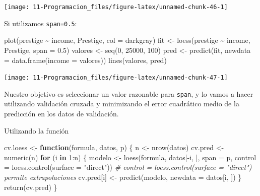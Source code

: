 \documentclass[
]{book}
\newenvironment{Shaded}{\begin{snugshade}}{\end{snugshade}}
\newcommand{\AttributeTok}[1]{\textcolor[rgb]{0.77,0.63,0.00}{#1}}
\newcommand{\CommentTok}[1]{\textcolor[rgb]{0.56,0.35,0.01}{\textit{#1}}}
\newcommand{\ControlFlowTok}[1]{\textcolor[rgb]{0.13,0.29,0.53}{\textbf{#1}}}
\newcommand{\DecValTok}[1]{\textcolor[rgb]{0.00,0.00,0.81}{#1}}
\newcommand{\FloatTok}[1]{\textcolor[rgb]{0.00,0.00,0.81}{#1}}
\newcommand{\FunctionTok}[1]{\textcolor[rgb]{0.00,0.00,0.00}{#1}}
\newcommand{\NormalTok}[1]{#1}
\newcommand{\OtherTok}[1]{\textcolor[rgb]{0.56,0.35,0.01}{#1}}
\newcommand{\SpecialCharTok}[1]{\textcolor[rgb]{0.00,0.00,0.00}{#1}}
\newcommand{\StringTok}[1]{\textcolor[rgb]{0.31,0.60,0.02}{#1}}
\theoremstyle{break}
\theoremstyle{nonumberplain}
\begin{document}
\begin{center}\texttt{[image: 11-Programacion\_files/figure-latex/unnamed-chunk-46-1]} \end{center}

Si utilizamos \texttt{span=0.5}:

\begin{Shaded}
\begin{Highlighting}[]
\FunctionTok{plot}\NormalTok{(prestige }\SpecialCharTok{\textasciitilde{}}\NormalTok{ income, Prestige, }\AttributeTok{col =} \StringTok{\textquotesingle{}darkgray\textquotesingle{}}\NormalTok{)}
\NormalTok{fit }\OtherTok{\textless{}{-}} \FunctionTok{loess}\NormalTok{(prestige }\SpecialCharTok{\textasciitilde{}}\NormalTok{ income, Prestige, }\AttributeTok{span =} \FloatTok{0.5}\NormalTok{)}
\NormalTok{valores }\OtherTok{\textless{}{-}} \FunctionTok{seq}\NormalTok{(}\DecValTok{0}\NormalTok{, }\DecValTok{25000}\NormalTok{, }\DecValTok{100}\NormalTok{)}
\NormalTok{pred }\OtherTok{\textless{}{-}} \FunctionTok{predict}\NormalTok{(fit, }\AttributeTok{newdata =} \FunctionTok{data.frame}\NormalTok{(}\AttributeTok{income =}\NormalTok{ valores))}
\FunctionTok{lines}\NormalTok{(valores, pred)}
\end{Highlighting}
\end{Shaded}

\begin{center}\texttt{[image: 11-Programacion\_files/figure-latex/unnamed-chunk-47-1]} \end{center}

Nuestro objetivo es seleccionar un valor razonable para \texttt{span}, y lo vamos a
hacer utilizando validación cruzada y minimizando el error cuadrático medio
de la predicción en los datos de validación.

Utilizando la función

\begin{Shaded}
\begin{Highlighting}[]
\NormalTok{cv.loess }\OtherTok{\textless{}{-}} \ControlFlowTok{function}\NormalTok{(formula, datos, p) \{}
\NormalTok{  n }\OtherTok{\textless{}{-}} \FunctionTok{nrow}\NormalTok{(datos)}
\NormalTok{  cv.pred }\OtherTok{\textless{}{-}} \FunctionTok{numeric}\NormalTok{(n)}
  \ControlFlowTok{for}\NormalTok{ (i }\ControlFlowTok{in} \DecValTok{1}\SpecialCharTok{:}\NormalTok{n) \{}
\NormalTok{    modelo }\OtherTok{\textless{}{-}} \FunctionTok{loess}\NormalTok{(formula, datos[}\SpecialCharTok{{-}}\NormalTok{i, ], }\AttributeTok{span =}\NormalTok{ p, }
                    \AttributeTok{control =} \FunctionTok{loess.control}\NormalTok{(}\AttributeTok{surface =} \StringTok{"direct"}\NormalTok{))}
    \CommentTok{\# control = loess.control(surface = "direct") permite extrapolaciones}
\NormalTok{    cv.pred[i] }\OtherTok{\textless{}{-}} \FunctionTok{predict}\NormalTok{(modelo, }\AttributeTok{newdata =}\NormalTok{ datos[i, ])}
\NormalTok{  \}}
  \FunctionTok{return}\NormalTok{(cv.pred)}
\NormalTok{\}}
\end{Highlighting}
\end{Shaded}
\end{document}
